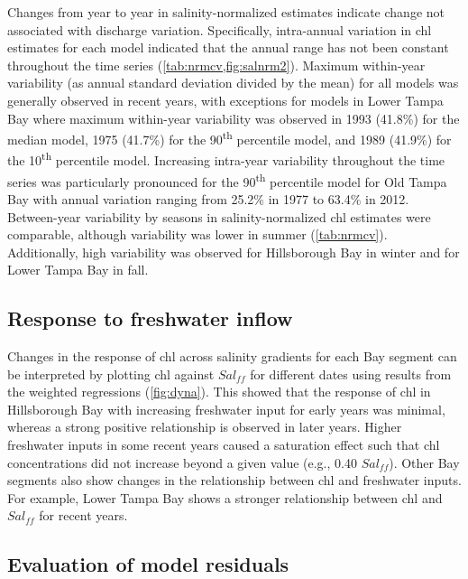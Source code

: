 \documentclass{svjour3}\usepackage[]{graphicx}\usepackage[]{color}
\newcommand{\nine}{90\textsuperscript{th} percentile }
\newcommand{\ten}{10\textsuperscript{th} percentile }
\begin{document}
Changes from year to year in salinity-normalized estimates indicate change not associated with discharge variation.  Specifically, intra-annual variation in \ac{chl} estimates for each model indicated that the annual range has not been constant throughout the time series (\cref{tab:nrmcv,fig:salnrm2}).  Maximum within-year variability (as annual standard deviation divided by the mean) for all models was generally observed in recent years, with exceptions for models in Lower Tampa Bay where maximum within-year variability was observed in 1993 (41.8\%) for the median model, 1975 (41.7\%) for the \nine model, and 1989 (41.9\%) for the \ten model.  Increasing intra-year variability throughout the time series was particularly pronounced for the \nine model for Old Tampa Bay with annual variation ranging from 25.2\% in 1977  to 63.4\% in 2012.  Between-year variability by seasons in salinity-normalized \ac{chl} estimates were comparable, although variability was lower in summer (\cref{tab:nrmcv}).  Additionally, high variability was observed for Hillsborough Bay in winter and for Lower Tampa Bay in fall.

\subsection{Response to freshwater inflow}

Changes in the response of \ac{chl} across salinity gradients for each Bay segment can be interpreted by plotting \ac{chl} against $Sal_{ff}$ for different dates using results from the weighted regressions (\cref{fig:dyna}).  This showed that the response of \ac{chl} in Hillsborough Bay with increasing freshwater input for early years was minimal, whereas a strong positive relationship is observed in later years.  Higher freshwater inputs in some recent years caused a saturation effect such that \ac{chl} concentrations did not increase beyond a given value (e.g., 0.40 $Sal_{ff}$).  Other Bay segments also show changes in the relationship between \ac{chl} and freshwater inputs.  For example, Lower Tampa Bay shows a stronger relationship between \ac{chl} and $Sal_{ff}$ for recent years. 

\subsection{Evaluation of model residuals}
\end{document}
